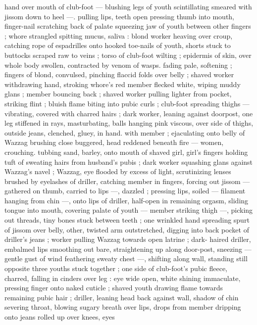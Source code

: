 hand over mouth of club-foot --- blushing legs of youth scintillating 
smeared with jissom down to heel ---. pulling lips, teeth open 
pressing thumb into mouth, finger-nail scratching back of palate 
squeezing jaw of youth between other fingers ; whore strangled 
spitting mucus, saliva : blond worker heaving over croup, catching 
rope of espadrilles onto hooked toe-nails of youth, shorts stuck to 
buttocks scraped raw to veins ; torso of club-foot wilting ; epidermis 
of skin, over whole body swollen, contracted by venom of wasps. 
fading pale, softening ; fingers of blond, convulsed, pinching flaccid 
folds over belly ; shaved worker withdrawing hand, stroking whore's 
red member flecked white, wiping muddy glans ; member bouncing 
back ; shaved worker pulling lighter from pocket, striking flint ; bluish 
flame biting into pubic curls ; club-foot spreading thighs --- 
vibrating, covered with charred hairs ; dark worker, leaning against 
doorpost, one leg stiffened in rays, masturbating, balls hanging pink 
viscous, over side of thighs, outside jeans, clenched, gluey, in hand. 
with member ; ejaculating onto belly of Wazzag brushing close 
buggered, head reddened beneath fire --- women, crouching. 
tubbing sand, barley, onto mouth of shaved girl, girl's fingers 
holding tuft of sweating hairs from husband's pubis ; dark worker 
squashing glans against Wazzag's navel ; Wazzag, eye flooded by 
excess of light, scrutinizing lenses brushed by eyelashes of driller, 
catching member in fingers, forcing out jissom --- gathered on 
thumb, carried to lips ---, dazzled ; pressing lips, soiled --- filament 
hanging from chin ---, onto lips of driller, half-open in remaining 
orgasm, sliding tongue into mouth, covering palate of youth --- 
member striking thigh ---, picking out threads, tiny bones stuck 
between teeth ; one wrinkled hand spreading spurt of jissom over 
belly, other, twisted arm outstretched, digging into back pocket of 
driller's jeans ; worker pulling Wazzag towards open latrine ; dark- 
haired driller, embalmed lips smoothing out bare, straightening up 
along door-post, sneezing --- gentle gust of wind feathering sweaty 
chest ---, shifting along wall, standing still opposite three youths 
stuck together ; one side of club-foot's pubic fleece, charred, falling 
in cinders over leg : eye wide open, white shining immaculate, 
pressing finger onto naked cuticle ; shaved youth drawing flame 
towards remaining pubic hair ; driller, leaning head back against wall, 
shadow of chin severing throat, blowing sugary breath over lips, 
drops from member dripping onto jeans rolled up over knees, eyes 
